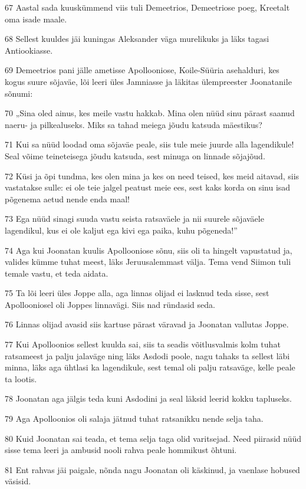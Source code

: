 \par 67 Aastal sada kuuskümmend viis tuli Demeetrios, Demeetriose poeg, Kreetalt oma isade maale.
\par 68 Sellest kuuldes jäi kuningas Aleksander väga murelikuks ja läks tagasi Antiookiasse.
\par 69 Demeetrios pani jälle ametisse Apollooniose, Koile-Süüria asehalduri, kes kogus suure sõjaväe, lõi leeri üles Jamniasse ja läkitas ülempreester Joonatanile sõnumi:
\par 70 „Sina oled ainus, kes meile vastu hakkab. Mina olen nüüd sinu pärast saanud naeru- ja pilkealuseks. Miks sa tahad meiega jõudu katsuda mäestikus?
\par 71 Kui sa nüüd loodad oma sõjaväe peale, siis tule meie juurde alla lagendikule! Seal võime teineteisega jõudu katsuda, sest minuga on linnade sõjajõud.
\par 72 Küsi ja õpi tundma, kes olen mina ja kes on need teised, kes meid aitavad, siis vastatakse sulle: ei ole teie jalgel peatust meie ees, sest kaks korda on sinu isad põgenema aetud nende enda maal!
\par 73 Ega nüüd sinagi suuda vastu seista ratsaväele ja nii suurele sõjaväele lagendikul, kus ei ole kaljut ega kivi ega paika, kuhu põgeneda!”
\par 74 Aga kui Joonatan kuulis Apollooniose sõnu, siis oli ta hingelt vapustatud ja, valides kümme tuhat meest, läks Jeruusalemmast välja. Tema vend Siimon tuli temale vastu, et teda aidata.
\par 75 Ta lõi leeri üles Joppe alla, aga linnas olijad ei lasknud teda sisse, sest Apollooniosel oli Joppes linnavägi. Siis nad ründasid seda.
\par 76 Linnas olijad avasid siis kartuse pärast väravad ja Joonatan vallutas Joppe.
\par 77 Kui Apolloonios sellest kuulda sai, siis ta seadis võitlusvalmis kolm tuhat ratsameest ja palju jalaväge ning läks Asdodi poole, nagu tahaks ta sellest läbi minna, läks aga ühtlasi ka lagendikule, sest temal oli palju ratsaväge, kelle peale ta lootis.
\par 78 Joonatan aga jälgis teda kuni Asdodini ja seal läksid leerid kokku tapluseks.
\par 79 Aga Apolloonios oli salaja jätnud tuhat ratsanikku nende selja taha.
\par 80 Kuid Joonatan sai teada, et tema selja taga olid varitsejad. Need piirasid nüüd sisse tema leeri ja ambusid nooli rahva peale hommikust õhtuni.
\par 81 Ent rahvas jäi paigale, nõnda nagu Joonatan oli käskinud, ja vaenlase hobused väsisid.
